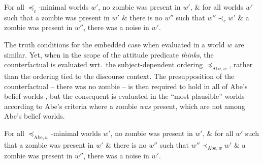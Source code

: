 \documentclass[output=paper]{langscibook}
\begin{document}
\ea \label{sch-has:ex:41}
\ea \label{sch-has:ex:41a} For all $\preceq_{c}$-minimal worlds $w'$, no zombie was present in $w'$, 
\ex \label{sch-has:ex:41b} $\&$ for all worlds $w'$ such that a zombie  was present in $w'$ $\&$ there is no $w''$ such that $w'' \prec_{c} w'$ $\&$ a zombie was present in $w''$, there was a noise in $w'$. \z\z

\noindent The truth conditions for the embedded case  when evaluated in a world $w$ are similar. Yet, when in the scope of the attitude predicate \textit{thinks}, the counterfactual is evaluated wrt.~the subject-dependent ordering $\preceq_{\text{Abe}, w}$, rather than the ordering tied to the discourse context. The presupposition of the counterfactual -- there was no zombie -- is then required to hold in all of Abe's belief worlds , but the consequent is evaluated in the ``most plausible'' worlds according to Abe's criteria where a zombie \textit{was} present, which are not among Abe's belief worlds. 

\ea \label{sch-has:ex:42}
\ea \label{sch-has:ex:42a} For all $\preceq_{\text{Abe}, w}$-minimal worlds $w'$, no zombie was present in $w'$, 
\ex \label{sch-has:ex:42b} $\&$ for all $w'$ such that a zombie was present in $w'$ $\&$ there is no $w''$ such that $w'' \prec_{\text{Abe}, w} w'$ $\&$ a zombie was present in $w''$, there was a noise in $w'$. \z\z
\end{document}
